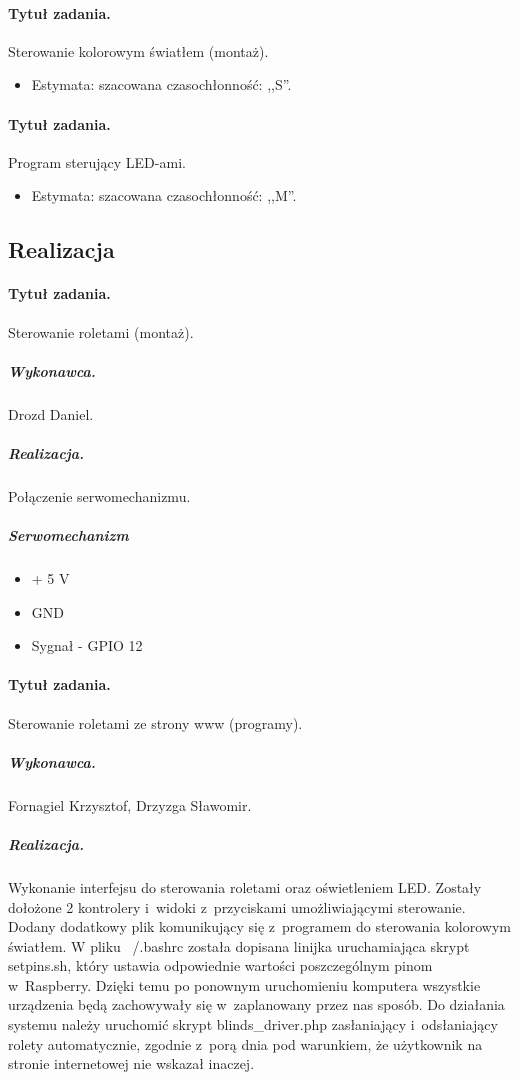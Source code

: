 \paragraph{Tytuł zadania.} Sterowanie kolorowym światłem (montaż).
\begin{itemize}
	\item Estymata: szacowana czasochłonność: ,,S''.
\end{itemize}

\paragraph{Tytuł zadania.} Program sterujący LED-ami.
\begin{itemize}
	\item Estymata: szacowana czasochłonność: ,,M''.
\end{itemize}


\subsection{Realizacja}

\paragraph{Tytuł zadania.} Sterowanie roletami (montaż).
\subparagraph{Wykonawca.} Drozd Daniel.
\subparagraph{Realizacja.} Połączenie serwomechanizmu.
\subparagraph{Serwomechanizm}

\begin{itemize}
	\item + 5 V
	\item GND
	\item Sygnał - GPIO 12
\end{itemize}
\paragraph{Tytuł zadania.} Sterowanie roletami ze strony www (programy).
\subparagraph{Wykonawca.} Fornagiel Krzysztof, Drzyzga Sławomir.
\subparagraph{Realizacja.} Wykonanie interfejsu do sterowania roletami oraz oświetleniem LED. Zostały dołożone 2 kontrolery i~widoki z~przyciskami umożliwiającymi sterowanie. Dodany dodatkowy plik komunikujący się z~programem do sterowania kolorowym światłem. W pliku ~/.bashrc została dopisana linijka uruchamiająca skrypt setpins.sh, który ustawia odpowiednie wartości poszczególnym pinom w~Raspberry. Dzięki temu po ponownym uruchomieniu komputera wszystkie urządzenia będą zachowywały się w~zaplanowany przez nas sposób. Do działania systemu należy uruchomić skrypt blinds\_driver.php zasłaniający i~odsłaniający rolety automatycznie, zgodnie z~porą dnia pod warunkiem, że użytkownik na stronie internetowej nie wskazał inaczej.
